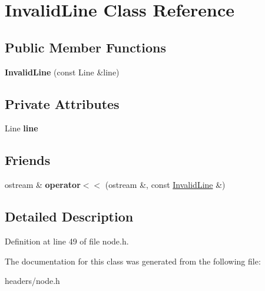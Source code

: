\hypertarget{classInvalidLine}{\section{Invalid\+Line Class Reference}
\label{classInvalidLine}
}
\subsection*{Public Member Functions}
\begin{DoxyCompactItemize}
\item 
\hypertarget{classInvalidLine_ac92ceb5d32da96a53d288e3e8d1515f3}{{\bfseries Invalid\+Line} (const Line \&line)}\label{classInvalidLine_ac92ceb5d32da96a53d288e3e8d1515f3}

\end{DoxyCompactItemize}
\subsection*{Private Attributes}
\begin{DoxyCompactItemize}
\item 
\hypertarget{classInvalidLine_ab5317a753030b760c2b7047db84cfdc9}{Line {\bfseries line}}\label{classInvalidLine_ab5317a753030b760c2b7047db84cfdc9}

\end{DoxyCompactItemize}
\subsection*{Friends}
\begin{DoxyCompactItemize}
\item 
\hypertarget{classInvalidLine_a83dd5c7533a6e45a97ea781c6ec0d830}{ostream \& {\bfseries operator$<$$<$} (ostream \&, const \hyperlink{classInvalidLine}{Invalid\+Line} \&)}\label{classInvalidLine_a83dd5c7533a6e45a97ea781c6ec0d830}

\end{DoxyCompactItemize}


\subsection{Detailed Description}


Definition at line 49 of file node.\+h.



The documentation for this class was generated from the following file\+:\begin{DoxyCompactItemize}
\item 
headers/node.\+h\end{DoxyCompactItemize}
